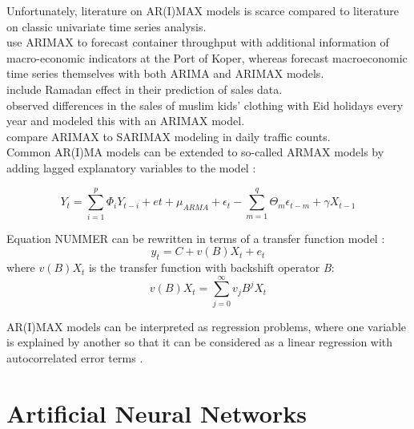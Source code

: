 \documentclass[a4paper, 11pt]{article}
\begin{document}
Unfortunately, literature on AR(I)MAX models is scarce compared to literature on classic univariate time series analysis.\\
\cite{Intihar.2017} use ARIMAX to forecast container throughput with additional information of macro-economic indicators at the Port of Koper, whereas \cite{Durka.2012} forecast macroeconomic time series themselves with both ARIMA and ARIMAX models.\\
\cite{Lee.2010} include Ramadan effect in their prediction of sales data. \\
\cite{Anggraeni.2015} observed differences in the sales of muslim kids' clothing with Eid holidays every year and modeled this with an ARIMAX model. \\
\cite{Cools.2009} compare ARIMAX to SARIMAX modeling in daily traffic counts. \\

Common AR(I)MA models can be extended to so-called ARMAX models by adding lagged explanatory variables to the model \citep{Andreoni.2006b}:

\begin{equation}
Y_{t} = \sum_{i = 1}^{p}\Phi_{i}Y_{t-i} + e{t} + \mu_{ARMA} + \epsilon_{t} - \sum_{m = 1}^{q} \Theta_{m}\epsilon_{t-m} + \gamma X_{t-1} 
\end{equation}

Equation NUMMER can be rewritten in terms of a transfer function model \citep{Durka.2012}:
\begin{equation}
y_{t} = C + v(B)X_{t} + e_{t}
\end{equation}
where $v(B)X_{t}$ is the transfer function with backshift operator \textit{B}:
\begin{equation}
	v(B)X_{t} = \sum_{j = 0}^{\infty} v_{j}B^{j}X_{t}
\end{equation}

AR(I)MAX models can be interpreted as regression problems, where one variable is explained by another so that it can be considered as a linear regression with autocorrelated error terms \citep{Cools.2009}.



\section{Artificial Neural Networks}
\end{document}
